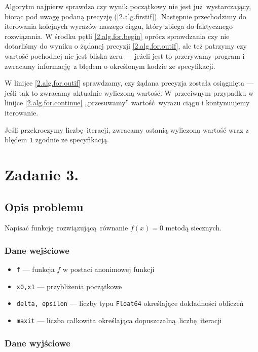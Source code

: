 \documentclass[10pt]{article}
\begin{document}
Algorytm najpierw sprawdza czy wynik początkowy nie jest już wystarczający, biorąc pod uwagę podaną precyzję (\ref{2.alg.firstif}). Następnie przechodzimy do iterowania kolejnych wyrazów naszego ciągu, który zbiega do faktycznego rozwiązania. W środku pętli \ref{2.alg.for.begin} oprócz sprawdzania czy nie dotarliśmy do wyniku o żądanej precyzji \ref{2.alg.for.outif}, ale też patrzymy czy wartość pochodnej nie jest bliska zeru — jeżeli jest to przerywamy program i zwracamy informację z błędem o określonym kodzie ze specyfikacji.

W linijce \ref{2.alg.for.outif} sprawdzamy, czy żądana precyzja została osiągnięta — jeśli tak to zwracamy aktualnie wyliczoną wartość. W przeciwnym przypadku w linijce \ref{2.alg.for.continue} „przesuwamy” wartość wyrazu ciągu i kontynuujemy iterowanie.

Jeśli przekroczymy liczbę iteracji, zwracamy ostanią wyliczoną wartość wraz z błędem \texttt{1} zgodnie ze specyfikacją.


\section{Zadanie 3.}

\subsection{Opis problemu}

Napisać funkcję rozwiązującą równanie $f(x) = 0$ metodą siecznych.

\subsubsection{Dane wejściowe}

\begin{itemize}
    \item \texttt{f} — funkcja $f$ w postaci anonimowej funkcji
    \item \texttt{x0,x1} — przybliżenia początkowe
    \item \texttt{delta, epsilon} — liczby typu \texttt{Float64} określające dokładności obliczeń
    \item \texttt{maxit} — liczba całkowita określająca dopuszczalną liczbę iteracji
\end{itemize}

\subsubsection{Dane wyjściowe}
\end{document}
